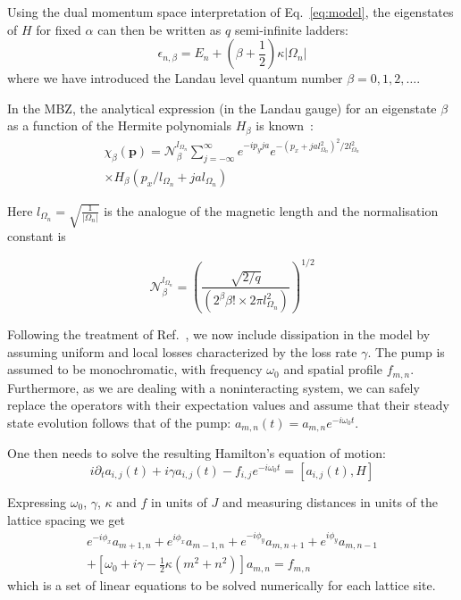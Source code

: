 \documentclass[twocolumn, 10pt, aps, superscriptaddress, floatfix, showpacs, prb, citeautoscript]{revtex4-1}
\newcommand{\vt}[1]{\mathbf{#1}}
\begin{document}
Using the dual momentum space interpretation of Eq.~\eqref{eq:model},
the eigenstates of $H$ for fixed $\alpha$ can then be written
as $q$ semi-infinite ladders:~\cite{price2014magnetic}
%
\begin{equation}\label{eq:ladders}
  \epsilon_{n,\beta} = E_n + \left(\beta + \frac{1}{2}\right) \kappa |\Omega_n|
\end{equation}
where we have introduced the Landau level quantum number
$\beta = 0,1,2,\dots$.

In the MBZ, the analytical expression (in the Landau gauge) for an
eigenstate $\beta$ as a function of the Hermite polynomials $H_\beta$
is known~\cite{price2014magnetic}:
%
\begin{multline}\label{eq:chi}
 \chi_\beta (\vt{p}) = \mathcal{N}_\beta^{l_{\Omega_n}} \sum_{j = -
 \infty}^{\infty} e^{- i p_y j a} e^{ - ( p_x + j a l_{\Omega_n}^2 )
 ^2 / 2 l_{\Omega_n}^2}\\
 \times H_\beta ( p_x / l_{\Omega_n} + j a
 l_{\Omega_n})
\end{multline}

Here $l_{\Omega_n} = \sqrt{\frac{1}{|\Omega_n|}}$ is the analogue of
the magnetic length and the normalisation constant is

\begin{equation}
\mathcal{N}_\beta^{l_{\Omega_n}} = \left( \frac{\sqrt{2/q}} {(2^\beta
\beta! \times 2 \pi l_{\Omega_n}^2)} \right)^{1/2}
\end{equation}

Following the treatment of Ref.~, we now
include dissipation in the model by assuming uniform and local losses
characterized by the loss rate $\gamma$. The pump is assumed to be
monochromatic, with frequency $\omega_0$ and spatial profile
$f_{m,n}$.  Furthermore, as we are dealing with a noninteracting
system, we can safely replace the operators with their expectation
values and assume that their steady state evolution follows that of
the pump: $a_{m,n}(t) = a_{m,n} e^{-i \omega_0 t}$.

One then needs to solve the resulting Hamilton's equation of motion:
%
\begin{equation}
i\partial_{t}a_{i,j}(t)+i\gamma
a_{i,j}(t)-f_{i,j}e^{-i\omega_{0}t}=\left[a_{i,j}(t),H\right]
\end{equation}

Expressing $\omega_{0}$, $\gamma$, $\kappa$ and $f$ in units of $J$
and measuring distances in units of the lattice spacing we get
%
\begin{multline}\label{eq:linear_problem}
e^{-i\phi_x}a_{m+1,n}+e^{i\phi_x}a_{m-1,n}+e^{-i\phi_y}a_{m,n+1}+e^{i\phi_y}a_{m,n-1}\\
+\left[\omega_{0}+i\gamma-\frac{1}{2}\kappa
(m^{2}+n^{2})\right]a_{m,n}=f_{m,n}
\end{multline}
which is a set of linear equations to be solved numerically for each
lattice site.
\end{document}
